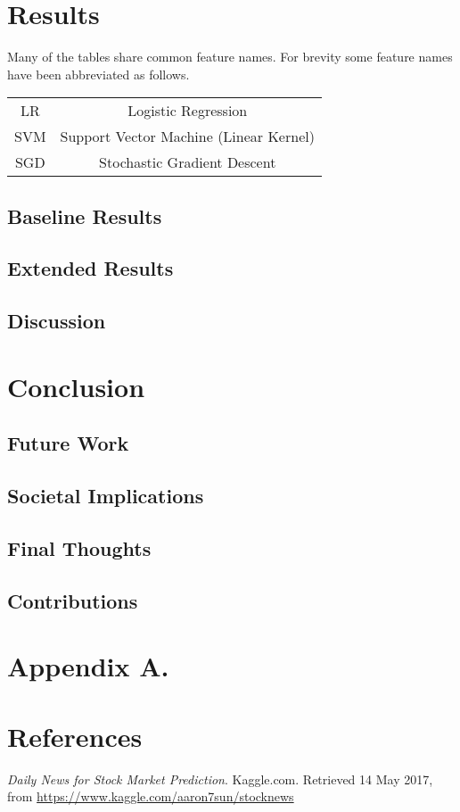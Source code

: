 \documentclass[11pt,a4paper]{article}
\begin{document}
\section{Results}
Many of the tables share common feature names. For brevity some feature names have been abbreviated as follows.
\begin{center}
\begin{tabular}{c c}
LR & Logistic Regression\\
SVM & Support Vector Machine (Linear Kernel)\\
SGD & Stochastic Gradient Descent
\end{tabular}
\end{center}

\subsection{Baseline Results}
\subsection{Extended Results}

\subsection{Discussion}

\section{Conclusion}
\subsection{Future Work}
\subsection{Societal Implications}
\subsection{Final Thoughts}

\subsection{Contributions}

\section*{Appendix A.}
\section*{References}


\textit{Daily News for Stock Market Prediction}. Kaggle.com. Retrieved 14 May 2017, from \url{https://www.kaggle.com/aaron7sun/stocknews}\\
\end{document}
